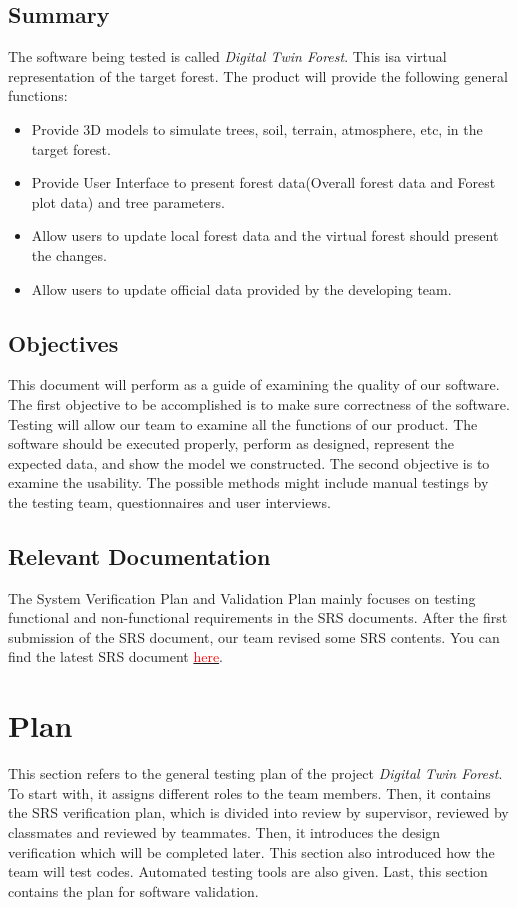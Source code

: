 \documentclass[12pt, titlepage]{article}
\begin{document}
\subsection{Summary}
The software being tested is called \textit{Digital Twin Forest}. This isa
virtual representation of the target forest. The product will provide the 
following general functions:
\begin{itemize}
    \item Provide 3D models to simulate trees, soil, terrain, atmosphere, etc,
    in the target forest.
    \item Provide User Interface to present forest data(Overall forest
    data and Forest plot data) and tree parameters.
    \item Allow users to update local forest data and the virtual forest
    should present the changes.
    \item Allow users to update official data provided by the developing
    team.
\end{itemize}

\subsection{Objectives}

This document will perform as a guide of examining the quality of our software. The
first objective to be accomplished is to make sure correctness of the software.
Testing will allow our team to examine all the functions of our product. The software
should be executed properly, perform as designed, represent the expected data, and
show the model we constructed. The second objective is to examine the usability. The
possible methods might include manual testings by the testing team, questionnaires and
user interviews. 

\subsection{Relevant Documentation}
The System Verification Plan and Validation Plan mainly focuses 
on testing functional and non-functional requirements in the SRS documents. After the first 
submission of the SRS document, our team revised some SRS contents. You
can find the latest SRS document
\href{https://github.com/wuj187/DigitalTwinCAS/blob/main/docs/SRS/SRS.pdf}{\textcolor{red}{here}}. 

\section{Plan}
This section refers to the general testing plan of the project \textit{Digital Twin Forest}. 
To start with, it assigns different roles to the team members. Then, it contains the
SRS verification plan, which is divided into review by supervisor, reviewed by classmates
and reviewed by teammates. Then, it introduces the design verification which will be
completed later. This section also introduced how the team will test codes. Automated
testing tools are also given. Last, this section contains the plan for software
validation.
\end{document}
